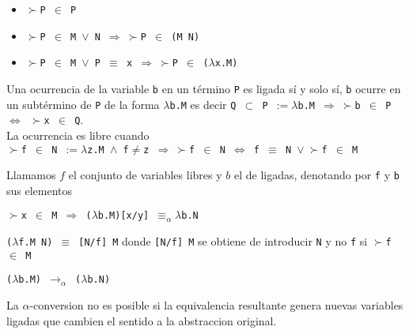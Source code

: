 \begin{defn}\end{defn}
\begin{itemize}
\item \texttt{$\succ$P $\in$ P}
\item \texttt{$\succ$P $\in$ M $\vee$ N $\Rightarrow \ \succ$P $\in$ (M N)}
\item \texttt{$\succ$P $\in$ M $\vee$ P $\equiv$ x $\Rightarrow \ \succ$P $\in$ ($\lambda$x.M)}
\end{itemize}

\begin{defn}\end{defn}
Una ocurrencia de la variable \texttt{b} en un término \texttt{P} es ligada sí y solo sí, \texttt{b} ocurre en un subtérmino de \texttt{P} de la forma \texttt{$\lambda$b.M} es decir 
\texttt{Q $\subset $ P $ := \lambda$b.M
$\Rightarrow \ \succ$b $\in$ P $\Leftrightarrow$ 
$\succ$x $\in$ Q}. \\
La ocurrencia es libre cuando \\
\texttt{$\succ$f $\in$ N $ := \lambda$z.M $\wedge$
f$\neq$z 
$\Rightarrow \ \succ$f $\in$ N $\Leftrightarrow  
$ f $\equiv$ N $\vee \ \succ$f $\in$ M }

\begin{note}
Llamamos $\mathit{f}$ el conjunto de variables libres
y $\mathit{b}$ el de ligadas, denotando por \texttt{f} y \texttt{b} sus elementos
\end{note}

\begin{defn}\end{defn}

\texttt{$\succ$x $\in$ M $\Rightarrow$ ($\lambda$b.M)[x/y] $\equiv_{\alpha} \lambda$b.N}

\begin{defn}\end{defn}
\texttt{($\lambda$f.M N) $\equiv$ [N/f] M} donde
\texttt{[N/f] M} se obtiene de introducir \texttt{N} y no \texttt{f} si \texttt{$\succ$f $\in$ M}

\begin{defn}\end{defn}
\texttt{($\lambda$b.M) $\rightarrow_{\alpha}$ ($\lambda$b.N)}
 
\begin{note}
La $\alpha$-conversion no es posible si la equivalencia resultante genera nuevas variables ligadas que cambien el sentido a la abstraccion original.
\end{note}

